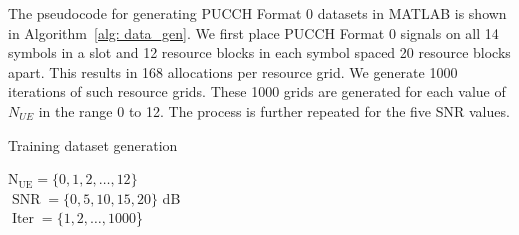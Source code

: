 \documentclass[journal]{IEEEtran}
\begin{document}
The pseudocode for generating PUCCH Format 0 datasets in MATLAB is shown in Algorithm~\ref{alg: data_gen}. We first place PUCCH Format 0 signals on all 14 symbols in a slot and 12 resource blocks in each symbol spaced 20 resource blocks apart. This results in 168 allocations per resource grid. We generate 1000 iterations of such resource grids. These 1000 grids are generated for each value of $N_{UE}$ in the range 0 to 12. The process is further repeated for the five SNR values.  

\begin{algorithm}[h]
    \caption{Training dataset generation}
    \label{alg: data_gen}
    $\operatorname{N_{UE}} = \{0, 1, 2, \dots, 12\}$ \\
    $\operatorname{SNR} = \{0, 5, 10, 15, 20\}$ dB \\
    $\operatorname{Iter} = \{1, 2, \dots, 1000$\} \\
\end{algorithm}
\end{document}

